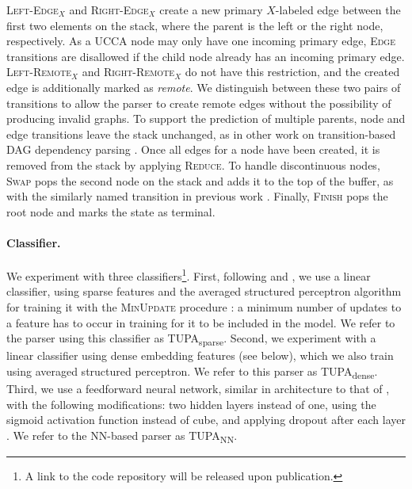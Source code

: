 \documentclass[11pt]{article}
\newcommand{\parser}[1]{TUPA\textsubscript{#1}}
\begin{document}
\textsc{Left-Edge$_X$} and \textsc{Right-Edge$_X$} create a new primary $X$-labeled edge between the first two elements on the stack, where the parent is the left or the right node, respectively.
As a UCCA node may only have one incoming primary edge,
\textsc{Edge} transitions are disallowed if the child node already
has an incoming primary edge.
\textsc{Left-Remote$_X$} and \textsc{Right-Remote$_X$} do not have this restriction,
and the created edge is additionally marked as \textit{remote}.
We distinguish between these two pairs of transitions to allow the parser to create remote edges
without the possibility of producing invalid graphs.
To support the prediction of multiple parents, node and edge transitions
leave the stack unchanged, as in other work on
transition-based DAG dependency parsing
\cite{sagae2008shift,ribeyre-villemontedelaclergerie-seddah:2014:SemEval,tokgoz2015transition}.
Once all edges for a node have been created, it is removed from the stack
by applying \textsc{Reduce}.
To handle discontinuous nodes, \textsc{Swap} pops the second
node on the stack and adds it to the top of the buffer, as with the similarly
named transition in previous work \cite{nivre2009non,maier2015discontinuous}.
Finally, \textsc{Finish} pops the root node and marks the state as terminal.

\paragraph{Classifier.}
We experiment with three classifiers\footnote{A link to the code repository will
be released upon publication.}.
First, following  and ,
we use a linear classifier, using sparse features and
the averaged structured perceptron algorithm for training it
\cite{Coll:04} with the \textsc{MinUpdate} procedure \cite{goldberg2011learning}:
a minimum number of updates to a feature has to occur in training for it
to be included in the model.
We refer to the parser using this classifier as \parser{sparse}.
Second, we experiment with a linear classifier using dense embedding features (see below),
which we also train using averaged structured perceptron.
We refer to this parser as \parser{dense}.
Third, we use a feedforward neural network, similar in architecture to that of , with the following modifications: two hidden layers instead of one, using the sigmoid activation function instead of cube,
and applying dropout after each layer \cite{srivastava2014dropout}.
We refer to the NN-based parser as \parser{NN}.
\end{document}

